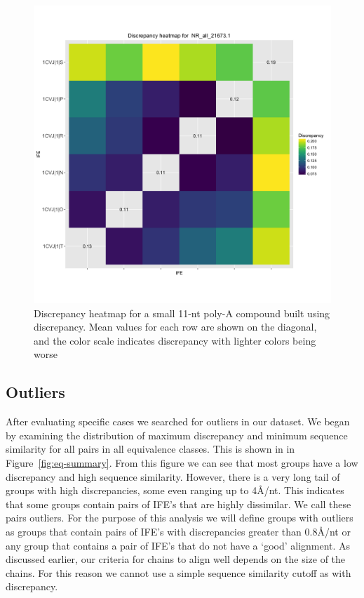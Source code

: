 \begin{figure}[h]
  \includegraphics[width=\textwidth]{chapter-3/figs/small-aa-disc}
  \caption{Discrepancy heatmap for a small 11-nt poly-A compound built using
    discrepancy. Mean values for each row are shown on the diagonal, and the
  color scale indicates discrepancy with lighter colors being worse}
  \label{fig:small-aa-disc}
\end{figure}

\subsection{Outliers}

After evaluating specific cases we searched for outliers in our dataset. We
began by examining the distribution of maximum discrepancy and minimum sequence
similarity for all pairs in all equivalence classes. This is shown in in
Figure~\ref{fig:eq-summary}. From this figure we can see that most groups have a low
discrepancy and high sequence similarity. However, there is a very long tail of
groups with high discrepancies, some even ranging up to 4{\AA}/nt. This indicates
that some groups contain pairs of IFE's that are highly dissimilar. We call
these pairs outliers. For the purpose of this analysis we will define groups
with outliers as groups that contain pairs of IFE's with discrepancies greater
than 0.8{\AA}/nt or any group that contains a pair of IFE's that do not have a
‘good’ alignment. As discussed earlier, our criteria for chains to align well
depends on the size of the chains. For this reason we cannot use a simple
sequence similarity cutoff as with discrepancy.

